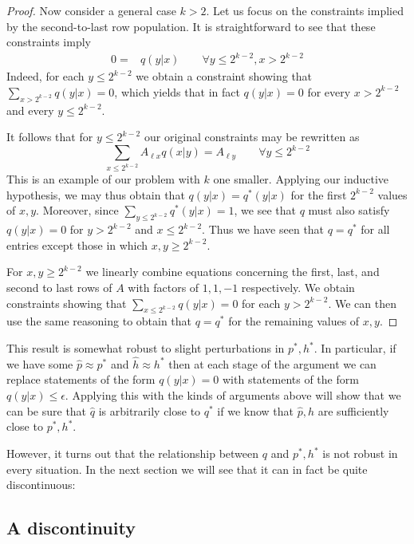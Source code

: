 \begin{itemize}
\begin{proof}
Now consider a general case $k>2$.  Let us focus on the constraints implied by the second-to-last row population.  It is straightforward to see that these constraints imply
\begin{align*}
0=&q(y|x) \qquad \forall y\leq 2^{k-2},x>2^{k-2}
\end{align*}
Indeed, for each $y\leq 2^{k-2}$ we obtain a constraint showing that $\sum_{x>2^{k-2}}q(y|x)=0$, which yields that in fact $q(y|x)=0$ for every $x>2^{k-2}$ and every $y\leq 2^{k-2}$.

It follows that for $y\leq 2^{k-2}$ our original constraints may be rewritten as
\[
\sum_{x\leq2^{k-2}} A_{\ell x} q(x|y) = A_{\ell y} \qquad \forall y\leq 2^{k-2}
\]
This is an example of our problem with $k$ one smaller.  Applying our inductive hypothesis, we may thus obtain that $q(y|x)=q^*(y|x)$ for the first $2^{k-2}$ values of $x,y$.  Moreover, since $\sum_{y\leq 2^{k-2}} q^*(y|x)=1$, we see that $q$ must also satisfy $q(y|x)=0$ for $y>2^{k-2}$ and $x\leq 2^{k-2}$.  Thus we have seen that $q=q^*$ for all entries except those in which $x,y\geq 2^{k-2}$.

For $x,y \geq2^{k-2}$ we linearly combine equations concerning the first, last, and second to last rows of $A$ with factors of $1,1,-1$ respectively.  We obtain constraints showing that $\sum_{x\leq2^{k-2}}q(y|x)=0$ for each $y>2^{k-2}$.  We can then use the same reasoning to obtain that $q=q^*$ for the remaining values of $x,y$.
\end{proof}

This result is somewhat robust to slight perturbations in $p^*,h^*$.  In particular, if we have some $\hat p\approx p^*$ and $\hat h\approx h^*$ then at each stage of the argument we can replace statements of the form $q(y|x)=0$ with statements of the form $q(y|x)\leq \epsilon$.  Applying this with the kinds of arguments above will show that we can be sure that $\hat q$ is arbitrarily close to $q^*$ if we know that $\hat p,\hat h$ are sufficiently close to $p^*,h^*$.  


However, it turns out that the relationship between $q$ and $p^*,h^*$ is not robust in every situation.  In the next section we will see that it can in fact be quite discontinuous:

\subsection{A discontinuity}


\end{itemize}
